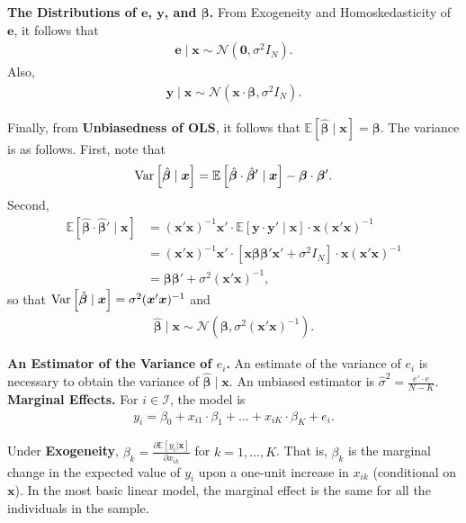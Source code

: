 \noindent \textbf{The Distributions of $\bm{e}$, $\bm{y}$, and $\bm{\beta}$.} From Exogeneity and Homoskedasticity of $\bm{e}$, it follows that 
		\begin{align}
			\bm{e} \mid \bm{x} \sim \mathcal{N} \left( \bm{0}, \sigma^2 I_{N} \right). 	
		\end{align}
\noindent Also,
	\begin{align}
		\bm{y} \mid \bm{x} \sim \mathcal{N} \left( \bm{x} \cdot \bm{\beta}, \sigma^2 I_{N} \right). 
	\end{align} 

\noindent Finally, from \textbf{Unbiasedness of OLS}, it follows that $\mathbb{E} \left[ \hat{\bm{\beta}} \mid \bm{x} \right] = \bm{\beta}$. The variance is as follows. First, note that 
		\begin{align}
				\operatorname{Var} \left[ \hat{\bm{\beta}} \mid \bm{x} \right] = \mathbb{E} \left[ \hat{\bm{\beta}} \cdot \hat{\bm{\beta}}' \mid \bm{x} \right] - {\bm{\beta}} \cdot {\bm{\beta}}'. 
		\end{align}
Second, 
		\begin{align}
			\mathbb{E} \left[ \hat{\bm{\beta}} \cdot \hat{\bm{\beta}}' \mid \bm{x} \right] & = {\left( \bm{x}' \bm{x} \right)}^{-1} \bm{x}' \cdot \mathbb{E} \left[ \bm{y} \cdot \bm{y}' \mid \bm{x} \right] \cdot \bm{x} {\left( \bm{x}' \bm{x} \right)}^{-1} \nonumber \\ 
					    & =  {\left( \bm{x}' \bm{x} \right)}^{-1} \bm{x}' \cdot 
					    \left[ \bm{x} \bm{\beta} \bm{\beta}' \bm{x}' + \sigma^2 I_{N} \right] 
					    \cdot \bm{x} {\left( \bm{x}' \bm{x} \right)}^{-1} \nonumber \\
					    & = \bm{\beta} \bm{\beta}' + \sigma^2  (\bm{x}' \bm{x})^{-1}, 
		\end{align}
\noindent so that $\operatorname{Var} \left[ \hat{\bm{\beta}} \mid \bm{x} \right] = \sigma^2  (\bm{x}' \bm{x})^{-1}$ and
	\begin{align}
		 \hat{\bm{\beta}} \mid \bm{x} \sim \mathcal{N} \left( \bm{\beta} , \sigma^2  { \left( \bm{x}' \bm{x} \right) }^{-1}\right). 
	\end{align} 

\noindent \textbf{An Estimator of the Variance of $e_i$.} An estimate of the variance of $e_i$ is necessary to obtain the variance of $\hat{\bm{\beta}} \mid \bm{x}$. An unbiased estimator is $\hat{\sigma}^2 = \frac{e' \cdot e}{N - K}$.\\

\noindent \textbf{Marginal Effects.} For $i \in \mathcal{I}$, the model is 
\begin{align}
	y_{i} = \beta_0 + x_{i1} \cdot \beta_1 + \ldots +  x_{iK} \cdot \beta_K + e_{i}. 
\end{align}

\noindent Under \textbf{Exogeneity}, $ \beta_k = \frac{ \partial \mathbb{E} \left[ y_{i} | \bm{x} \right] } { \partial x_{ik} }$ for $k = 1, \ldots, K$. That is, $\beta_k$ is the marginal change in the expected value of $y_i$ upon a one-unit increase in $x_{ik}$ (conditional on $\bm{x}$). In the most basic linear model, the marginal effect is the same for all the individuals in the sample.


